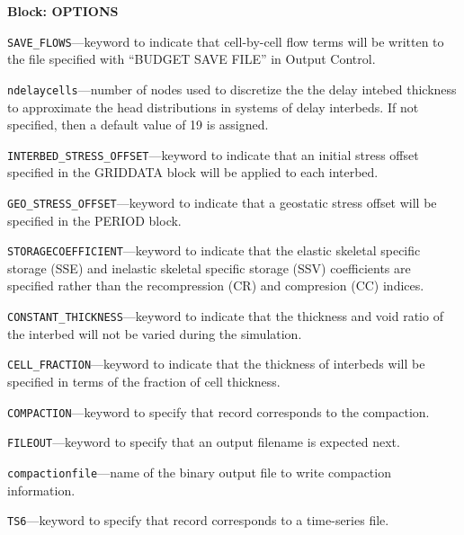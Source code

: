 
\item \textbf{Block: OPTIONS}

\begin{description}
\item \texttt{SAVE\_FLOWS}---keyword to indicate that cell-by-cell flow terms will be written to the file specified with ``BUDGET SAVE FILE'' in Output Control.

\item \texttt{ndelaycells}---number of nodes used to discretize the the delay intebed thickness to approximate the head distributions in systems of delay interbeds. If not specified, then a default value of 19 is assigned.

\item \texttt{INTERBED\_STRESS\_OFFSET}---keyword to indicate that an initial stress offset specified in the GRIDDATA block will be applied to each interbed.

\item \texttt{GEO\_STRESS\_OFFSET}---keyword to indicate that a geostatic stress offset will be specified in the PERIOD block.

\item \texttt{STORAGECOEFFICIENT}---keyword to indicate that the elastic skeletal specific storage (SSE) and inelastic skeletal specific storage (SSV) coefficients are specified rather than the recompression (CR) and compresion (CC) indices.

\item \texttt{CONSTANT\_THICKNESS}---keyword to indicate that the thickness and void ratio of the interbed will not be varied during the simulation.

\item \texttt{CELL\_FRACTION}---keyword to indicate that the thickness of interbeds will be specified in terms of the fraction of cell thickness.

\item \texttt{COMPACTION}---keyword to specify that record corresponds to the compaction.

\item \texttt{FILEOUT}---keyword to specify that an output filename is expected next.

\item \texttt{compactionfile}---name of the binary output file to write compaction information.

\item \texttt{TS6}---keyword to specify that record corresponds to a time-series file.


\end{description}
